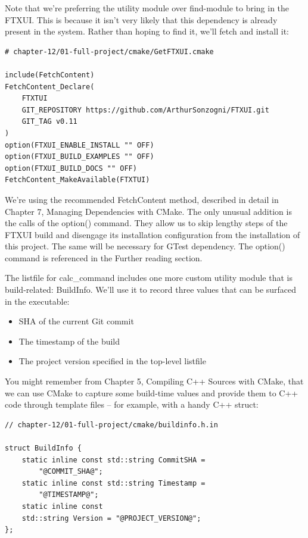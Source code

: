 Note that we're preferring the utility module over find-module to bring in the FTXUI. This is because it isn't very likely that this dependency is already present in the system. Rather than hoping to find it, we'll fetch and install it:

\begin{lstlisting}[style=styleCMake]
# chapter-12/01-full-project/cmake/GetFTXUI.cmake

include(FetchContent)
FetchContent_Declare(
	FTXTUI
	GIT_REPOSITORY https://github.com/ArthurSonzogni/FTXUI.git
	GIT_TAG v0.11
)
option(FTXUI_ENABLE_INSTALL "" OFF)
option(FTXUI_BUILD_EXAMPLES "" OFF)
option(FTXUI_BUILD_DOCS "" OFF)
FetchContent_MakeAvailable(FTXTUI)
\end{lstlisting}

We're using the recommended FetchContent method, described in detail in Chapter 7, Managing Dependencies with CMake. The only unusual addition is the calls of the option() command. They allow us to skip lengthy steps of the FTXUI build and disengage its installation configuration from the installation of this project. The same will be necessary for GTest dependency. The option() command is referenced in the Further reading section.

The listfile for calc\_command includes one more custom utility module that is build-related: BuildInfo. We'll use it to record three values that can be surfaced in the executable:

\begin{itemize}
\item 
SHA of the current Git commit

\item 
The timestamp of the build

\item 
The project version specified in the top-level listfile
\end{itemize}

You might remember from Chapter 5, Compiling C++ Sources with CMake, that we can use CMake to capture some build-time values and provide them to C++ code through template files – for example, with a handy C++ struct:

\begin{lstlisting}[style=styleCXX]
// chapter-12/01-full-project/cmake/buildinfo.h.in

struct BuildInfo {
	static inline const std::string CommitSHA =
		"@COMMIT_SHA@";
	static inline const std::string Timestamp =
		"@TIMESTAMP@";
	static inline const
	std::string Version = "@PROJECT_VERSION@";
};
\end{lstlisting}

